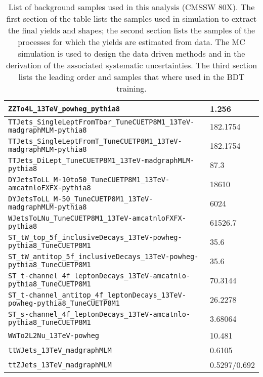 \begin{table}
\begin{tabular}{ll}
    \verb|ZZTo4L_13TeV_powheg_pythia8|                                              & 1.256 \\ \hline
    \verb|TTJets_SingleLeptFromTbar_TuneCUETP8M1_13TeV-madgraphMLM-pythia8|         & 182.1754  \\
    \verb|TTJets_SingleLeptFromT_TuneCUETP8M1_13TeV-madgraphMLM-pythia8|            & 182.1754  \\
    \verb|TTJets_DiLept_TuneCUETP8M1_13TeV-madgraphMLM-pythia8|                     & 87.3  \\
    \verb|DYJetsToLL_M-10to50_TuneCUETP8M1_13TeV-amcatnloFXFX-pythia8|              & 18610 \\
    \verb|DYJetsToLL_M-50_TuneCUETP8M1_13TeV-madgraphMLM-pythia8|                   & 6024 \\
    \verb|WJetsToLNu_TuneCUETP8M1_13TeV-amcatnloFXFX-pythia8|                       & 61526.7 \\
    \verb|ST_tW_top_5f_inclusiveDecays_13TeV-powheg-pythia8_TuneCUETP8M1|           & 35.6 \\
    \verb|ST_tW_antitop_5f_inclusiveDecays_13TeV-powheg-pythia8_TuneCUETP8M1|       & 35.6 \\
    \verb|ST_t-channel_4f_leptonDecays_13TeV-amcatnlo-pythia8_TuneCUETP8M1|         & 70.3144\\
    \verb|ST_t-channel_antitop_4f_leptonDecays_13TeV-powheg-pythia8_TuneCUETP8M1|   & 26.2278\\
    \verb|ST_s-channel_4f_leptonDecays_13TeV-amcatnlo-pythia8_TuneCUETP8M1|         & 3.68064 \\
    \verb|WWTo2L2Nu_13TeV-powheg|                                                   & 10.481 \\\hline
    \verb|ttWJets_13TeV_madgraphMLM|                                                & 0.6105 \\
    \verb|ttZJets_13TeV_madgraphMLM|                                                & 0.5297/0.692 \\\hline
    
  \end{tabular}
  \caption[List of background samples used in this analysis (CMSSW 80X).]{List of background samples used in this analysis (CMSSW 80X). The first section of the table lists the samples used in simulation to extract the final yields and shapes; the second section lists the samples of the processes for which the yields are estimated from data. The MC simulation is used to design the data driven methods and in the derivation of the associated systematic uncertainties. The third section lists the leading order \ttW and \ttZ samples that where used in the BDT training.} \label{tab:bgsamples}
\end{table}
